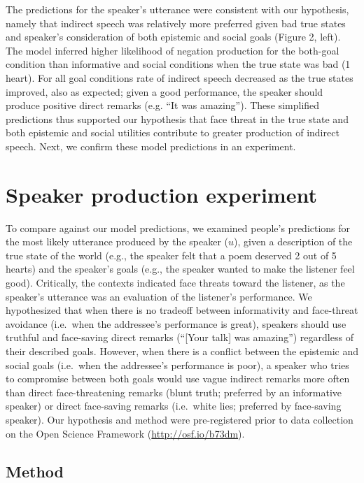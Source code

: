 \documentclass[10pt, letterpaper]{article}
\begin{document}
The predictions for the speaker's utterance were consistent with our
hypothesis, namely that indirect speech was relatively more preferred
given bad true states and speaker's consideration of both epistemic and
social goals (Figure 2, left). The model inferred higher likelihood of
negation production for the both-goal condition than informative and
social conditions when the true state was bad (1 heart). For all goal
conditions rate of indirect speech decreased as the true states
improved, also as expected; given a good performance, the speaker should
produce positive direct remarks (e.g. ``It was amazing''). These
simplified predictions thus supported our hypothesis that face threat in
the true state and both epistemic and social utilities contribute to
greater production of indirect speech. Next, we confirm these model
predictions in an experiment.

\section{Speaker production
experiment}\label{speaker-production-experiment}

To compare against our model predictions, we examined people's
predictions for the most likely utterance produced by the speaker
(\(u\)), given a description of the true state of the world (e.g., the
speaker felt that a poem deserved 2 out of 5 hearts) and the speaker's
goals (e.g., the speaker wanted to make the listener feel good).
Critically, the contexts indicated face threats toward the listener, as
the speaker's utterance was an evaluation of the listener's performance.
We hypothesized that when there is no tradeoff between informativity and
face-threat avoidance (i.e.~when the addressee's performance is great),
speakers should use truthful and face-saving direct remarks (``{[}Your
talk{]} was amazing'') regardless of their described goals. However,
when there is a conflict between the epistemic and social goals
(i.e.~when the addressee's performance is poor), a speaker who tries to
compromise between both goals would use vague indirect remarks more
often than direct face-threatening remarks (blunt truth; preferred by an
informative speaker) or direct face-saving remarks (i.e.~white lies;
preferred by face-saving speaker). Our hypothesis and method were
pre-registered prior to data collection on the Open Science Framework
(\url{http://osf.io/b73dm}).

\subsection{Method}\label{method}
\end{document}
